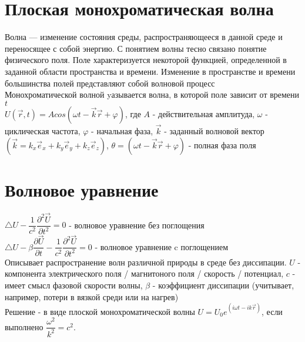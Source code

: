 \newcommand{\colontitulAutors}{astronom\_v\_cube,~edombek}
\newcommand{\colontitulYear}{2023~}
\newcommand{\colontitulEducationalSubject}{Физика волновых процессов}
\newcommand{\colontitulTeacher}{Петров Е. Ю.}



\newcommand{\rot}{\operatorname{rot}}


	\small
	\begin{multicols*}{2}

		\section{Плоская монохроматическая волна}
		Волна — изменение состояния среды, распространяющееся в данной среде и переносящее с собой энергию. С понятием волны тесно связано понятие физического поля. Поле характеризуется некоторой функцией, определенной в заданной области пространства и времени. Изменение в пространстве и времени большинства полей представляют собой волновой процесс\\
		Монохроматической волной yазывается волна, в которой поле зависит от времени $t$\\
		$U(\vec{r}, t) = A cos(\omega t - \vec{k} \vec{r} + \varphi )$, где $A$ - действительная амплитуда, $\omega$ - циклическая частота, $\varphi $ - начальная фаза, $\vec{k}$ - заданный волновой вектор $(\vec{k} = k_x \vec{e}_x + k_y \vec{e}_y + k_z \vec{e}_z)$, $\theta = (\omega t - \vec{k} \vec{r} + \varphi )$ - полная фаза поля

		\section{Волновое уравнение}
		$\bigtriangleup U - \dfrac{1}{c^2} \dfrac{\partial^2 \vec{U}}{\partial t^2} = 0$ - волновое уравнение без поглощения\\
		$\bigtriangleup U - \beta\dfrac{\partial\vec{U}}{\partial t} -\dfrac{1}{c^2} \dfrac{\partial^2 \vec{U}}{\partial t^2} = 0$ - волновое уравнение c поглощением\\
		Описывает распространение волн различной природы в среде без диссипации.
		$U$ - компонента электрического поля / магнитоного поля / скорость / потенциал, $c$ - имеет смысл фазовой скорости волны, $\beta$ - коэффициент диссипации (учитывает, например, потери в вязкой среди или на нагрев)\\
		Решение - в виде плоской монохроматической волны $U = U_0 e^{(i\omega t - i k \vec{r})}$, если выполнено $\dfrac{\omega^2}{k^2} = c^2$.


\end{multicols*}
